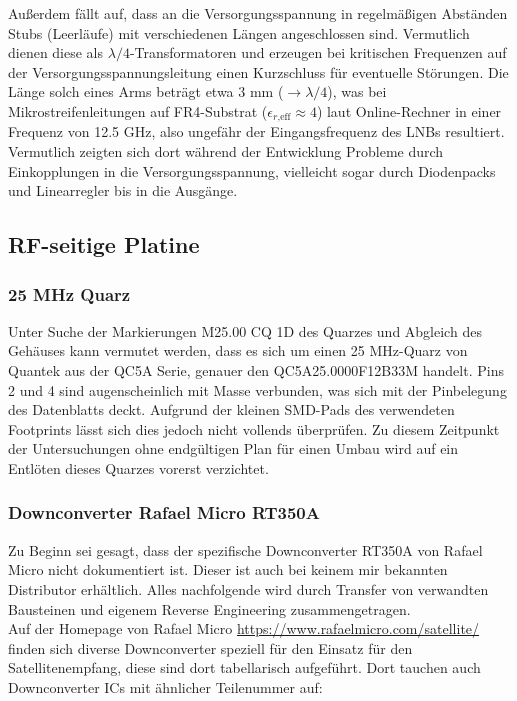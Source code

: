 \documentclass[]{article}
\begin{document}
		\noindent Außerdem fällt auf, dass an die Versorgungsspannung in regelmäßigen Abständen Stubs (Leerläufe) mit verschiedenen Längen angeschlossen sind. Vermutlich dienen diese als $\lambda/4$-Transformatoren und erzeugen bei kritischen Frequenzen auf der Versorgungsspannungsleitung einen Kurzschluss für eventuelle Störungen. Die Länge solch eines Arms beträgt etwa 3 mm ($\rightarrow\lambda/4$), was bei Mikrostreifenleitungen auf FR4-Substrat ($\epsilon_{r\text{,eff}}\approx4$) laut Online-Rechner in einer Frequenz von 12.5 GHz, also ungefähr der Eingangsfrequenz des LNBs resultiert. Vermutlich zeigten sich dort während der Entwicklung Probleme durch Einkopplungen in die Versorgungsspannung, vielleicht sogar durch Diodenpacks und Linearregler bis in die Ausgänge.
		
	\subsection{RF-seitige Platine}
	
	
	\subsubsection{25 MHz Quarz}
	
		\noindent Unter Suche der Markierungen \glqq M25.00 CQ 1D\grqq{} des Quarzes und Abgleich des Gehäuses kann vermutet werden, dass es sich um einen 25 MHz-Quarz von Quantek aus der QC5A Serie, genauer den QC5A25.0000F12B33M handelt. Pins 2 und 4 sind augenscheinlich mit Masse verbunden, was sich mit der Pinbelegung des Datenblatts deckt. Aufgrund der kleinen SMD-Pads des verwendeten Footprints lässt sich dies jedoch nicht vollends überprüfen. Zu diesem Zeitpunkt der Untersuchungen ohne endgültigen Plan für einen Umbau wird auf ein Entlöten dieses Quarzes vorerst verzichtet.
		
	\subsubsection{Downconverter Rafael Micro RT350A}
		
		\noindent Zu Beginn sei gesagt, dass der spezifische Downconverter RT350A von Rafael Micro nicht dokumentiert ist. Dieser ist auch bei keinem mir bekannten Distributor erhältlich. Alles nachfolgende wird durch Transfer von verwandten Bausteinen und eigenem Reverse Engineering zusammengetragen.\\
		
		\noindent Auf der Homepage von Rafael Micro \url{https://www.rafaelmicro.com/satellite/} finden sich diverse Downconverter speziell für den Einsatz für den Satellitenempfang, diese sind dort tabellarisch aufgeführt. Dort tauchen auch Downconverter ICs mit ähnlicher Teilenummer auf:\\
		
\end{document}
